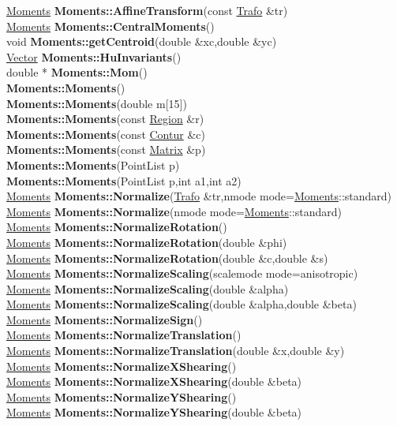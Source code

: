 \documentclass[10pt,titlepage]{article}
\def\functionlistentry#1#2#3#4#5#6{\noindent #1 {\bf #2}(#3) \dotfill #6\\}
\begin{document}
{{\functionlistentry{\hyperlink{Moments}{Moments}}{Moments::AffineTransform}{const \hyperlink{Trafo}{Trafo} \&tr}{820}{moments}{}
\functionlistentry{\hyperlink{Moments}{Moments}}{Moments::CentralMoments}{}{813}{moments}{}
\functionlistentry{void}{Moments::getCentroid}{double \&xc,double \&yc}{812}{moments}{}
\functionlistentry{\hyperlink{Vector}{Vector}}{Moments::HuInvariants}{}{822}{moments}{}
\functionlistentry{double *}{Moments::Mom}{}{810}{moments}{}
\functionlistentry{}{Moments::Moments}{}{803}{moments}{}
\functionlistentry{}{Moments::Moments}{double m[15]}{804}{moments}{}
\functionlistentry{}{Moments::Moments}{const \hyperlink{Region}{Region} \&r}{805}{moments}{}
\functionlistentry{}{Moments::Moments}{const \hyperlink{Contur}{Contur} \&c}{806}{moments}{}
\functionlistentry{}{Moments::Moments}{const \hyperlink{Matrix}{Matrix} \&p}{807}{moments}{}
\functionlistentry{}{Moments::Moments}{PointList p}{808}{moments}{}
\functionlistentry{}{Moments::Moments}{PointList p,int a1,int a2}{809}{moments}{}
\functionlistentry{\hyperlink{Moments}{Moments}}{Moments::Normalize}{\hyperlink{Trafo}{Trafo} \&tr,nmode mode=\hyperlink{Moments}{Moments}::standard}{837}{moments}{}
\functionlistentry{\hyperlink{Moments}{Moments}}{Moments::Normalize}{nmode mode=\hyperlink{Moments}{Moments}::standard}{838}{moments}{}
\functionlistentry{\hyperlink{Moments}{Moments}}{Moments::NormalizeRotation}{}{834}{moments}{}
\functionlistentry{\hyperlink{Moments}{Moments}}{Moments::NormalizeRotation}{double \&phi}{835}{moments}{}
\functionlistentry{\hyperlink{Moments}{Moments}}{Moments::NormalizeRotation}{double \&c,double \&s}{836}{moments}{}
\functionlistentry{\hyperlink{Moments}{Moments}}{Moments::NormalizeScaling}{scalemode mode=anisotropic}{831}{moments}{}
\functionlistentry{\hyperlink{Moments}{Moments}}{Moments::NormalizeScaling}{double \&alpha}{832}{moments}{}
\functionlistentry{\hyperlink{Moments}{Moments}}{Moments::NormalizeScaling}{double \&alpha,double \&beta}{833}{moments}{}
\functionlistentry{\hyperlink{Moments}{Moments}}{Moments::NormalizeSign}{}{824}{moments}{}
\functionlistentry{\hyperlink{Moments}{Moments}}{Moments::NormalizeTranslation}{}{825}{moments}{}
\functionlistentry{\hyperlink{Moments}{Moments}}{Moments::NormalizeTranslation}{double \&x,double \&y}{826}{moments}{}
\functionlistentry{\hyperlink{Moments}{Moments}}{Moments::NormalizeXShearing}{}{827}{moments}{}
\functionlistentry{\hyperlink{Moments}{Moments}}{Moments::NormalizeXShearing}{double \&beta}{828}{moments}{}
\functionlistentry{\hyperlink{Moments}{Moments}}{Moments::NormalizeYShearing}{}{829}{moments}{}
\functionlistentry{\hyperlink{Moments}{Moments}}{Moments::NormalizeYShearing}{double \&beta}{830}{moments}{}
}}
\end{document}
